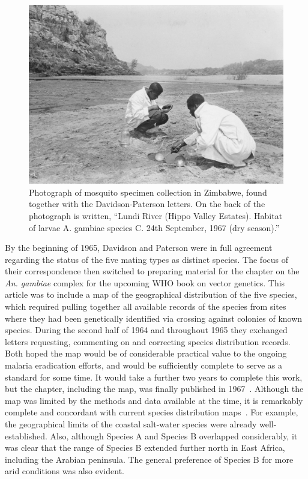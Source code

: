 \documentclass[a4paper,11pt,abstracton,hidelinks]{scrartcl}
\begin{document}
\begin{figure}[t]
\centering
\includegraphics[width=\textwidth]{davidson-letters/Photo-Zimbabwe-Lundi.pdf}
\caption{Photograph of mosquito specimen collection in Zimbabwe, found together with the Davidson-Paterson letters. On the back of the photograph is written, ``Lundi River (Hippo Valley Estates). Habitat of larvae A. gambiae species C. 24th September, 1967 (dry season).''}
    \label{fig:photo-lundi}
\end{figure}


By the beginning of 1965, Davidson and Paterson were in full agreement regarding the status of the five mating types as distinct species.
%
The focus of their correspondence then switched to preparing material for the chapter on the \textit{An. gambiae} complex for the upcoming WHO book on vector genetics.
%
This article was to include a map of the geographical distribution of the five species, which required pulling together all available records of the species from sites where they had been genetically identified via crossing against colonies of known species.
%
During the second half of 1964 and throughout 1965 they exchanged letters requesting, commenting on and correcting species distribution records.
%
Both hoped the map would be of considerable practical value to the ongoing malaria eradication efforts, and would be sufficiently complete to serve as a standard for some time.
%
It would take a further two years to complete this work, but the chapter, including the map, was finally published in 1967~\parencite{Davidson1967}.
%
Although the map was limited by the methods and data available at the time, it is remarkably complete and concordant with current species distribution maps~\parencite{Wiebe2017}.
%
For example, the geographical limits of the coastal salt-water species were already well-established.
%
Also, although Species A and Species B overlapped considerably, it was clear that the range of Species B extended further north in East Africa, including the Arabian peninsula.
%
The general preference of Species B for more arid conditions was also evident.
\end{document}
